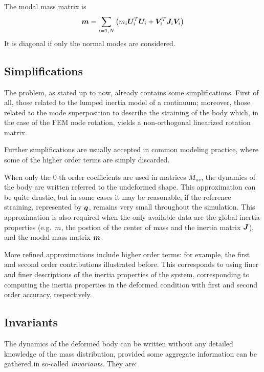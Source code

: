 The modal mass matrix is
\begin{equation}
	\bm{m} = \sum_{i=1,N} \left( 
		m_i \bm{U}_i^T \bm{U}_i
		+ \bm{V}_i^T \bm{J}_i \bm{V}_i
	 \right)
\end{equation}
It is diagonal if only the normal modes are considered.

\subsection{Simplifications}
The problem, as stated up to now, already contains some simplifications.
First of all, those related to the lumped inertia model of a continuum;
moreover, those related to the mode superposition to describe the
straining of the body which, in the case of the FEM node rotation,
yields a non-orthogonal linearized rotation matrix.

Further simplifications are usually accepted in common modeling practice,
where some of the higher order terms are simply discarded.

When only the 0-th order coefficients are used in matrices $M_{uv}$,
the dynamics of the body are written referred to the undeformed shape.
This approximation can be quite drastic, but in some cases it may be
reasonable, if the reference straining, represented by $\bm{q}$,
remains very small throughout the simulation.
This approximation is also required when the only available data
are the global inertia properties (e.g.\ $m$, the postion 
of the center of mass and the inertia matrix $\bm{J}$),
and the modal mass matrix $\bm{m}$.

More refined approximations include higher order terms: for example, the
first and second order contributions illustrated before.
This corresponds to using finer and finer descriptions of the inertia
properties of the system, corresponding to computing the inertia properties 
in the deformed condition with first and second order accuracy, respectively.

\subsection{Invariants}
The dynamics of the deformed body can be written without any detailed
knowledge of the mass distribution, provided some aggregate information
can be gathered in so-called \emph{invariants}.
They are:

